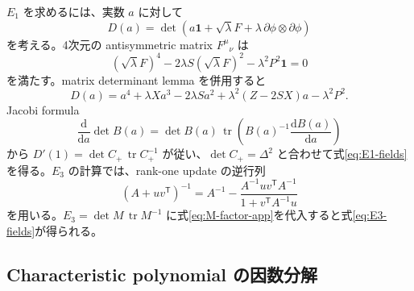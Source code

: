 \documentclass[a4paper,11pt]{ltjsarticle}
\numberwithin{equation}{section}
\newcommand{\dd}{\mathrm d}
\newcommand{\tr}{\operatorname{tr}}
\newcommand{\Id}{\mathbf 1}
\begin{document}
$E_1$ を求めるには、実数 $a$ に対して
\begin{equation}
 D(a)=\det\!\left(a\Id+\sqrt\lambda F
 +\lambda\,\partial\phi\otimes\partial\phi\right)
 \label{eq:Da-app}
\end{equation}
を考える。4次元の antisymmetric matrix $F^\mu{}_{\nu}$ は
\begin{equation}
 (\sqrt\lambda F)^4-2\lambda S(\sqrt\lambda F)^2-\lambda^2P^2\Id=0
 \label{eq:F-CH-app}
\end{equation}
を満たす。matrix determinant lemma を併用すると
\begin{equation}
 D(a)=a^4+\lambda Xa^3-2\lambda Sa^2
 +\lambda^2(Z-2SX)a-\lambda^2P^2.
 \label{eq:D-polynomial-app}
\end{equation}
Jacobi formula
\begin{equation}
 \frac{\dd}{\dd a}\det B(a)
 =\det B(a)\,\tr\!\left(B(a)^{-1}\frac{\dd B(a)}{\dd a}\right)
 \label{eq:jacobi-app}
\end{equation}
から $D'(1)=\det C_+\,\tr C_+^{-1}$ が従い、$\det C_+=\Delta^2$ と合わせて式\eqref{eq:E1-fields}を得る。$E_3$ の計算では、rank-one update の逆行列
\begin{equation}
 (A+uv^{\mathsf T})^{-1}
 =A^{-1}-\frac{A^{-1}uv^{\mathsf T}A^{-1}}
 {1+v^{\mathsf T}A^{-1}u}
 \label{eq:sherman-morrison-app}
\end{equation}
を用いる。$E_3=\det M\,\tr M^{-1}$ に式\eqref{eq:M-factor-app}を代入すると式\eqref{eq:E3-fields}が得られる。

\subsection{Characteristic polynomial の因数分解}
\end{document}
